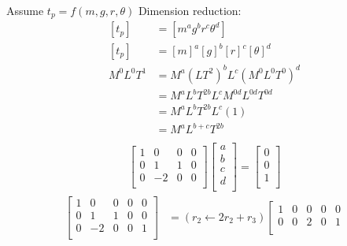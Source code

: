 \documentclass[
	date={August 26{,} 2024}
]{math486notes}
\begin{document}
\begin{example}[Pendulum]
	Assume $t_{p} = f(m, g, r, \theta)$
	Dimension reduction:
	\begin{equation*}
	\begin{aligned}
		[t_{p}] &= [m^{a}g^{b}r^{c}\theta^{d}]\\
		[t_{p}] &= [m]^{a}[g]^{b}[r]^{c}[\theta]^{d}\\
		M^{0}L^{0}T^{1} &= M^{a}\left( LT^{2} \right)^{b} L^{c} \left( M^{0}L^{0}T^{0} \right)^{d}\\
						&= M^{a}L^{b}T^{2b}L^{c} M^{0d}L^{0d}T^{0d}\\
						&= M^{a}L^{b}T^{2b}L^{c} (1)\\
						&= M^{a}L^{b+c}T^{2b}\\
	\end{aligned}
	\end{equation*}
	\begin{equation*}
	\begin{aligned}
		\left[ \begin{array}{cccc}
			 1 & 0 & 0 & 0\\
			 0 & 1 & 1 & 0\\
			0 & -2 & 0 & 0\\
		\end{array} \right]\left[ \begin{array}{c}
			a\\
			b\\
			c\\
			d\\
		\end{array} \right] = \left[ \begin{array}{c}
			0\\
			0\\
			1\\
		\end{array} \right]
	\end{aligned}
	\end{equation*}
	\begin{equation*}
	\begin{aligned}
		\left[ \begin{array}{cccc|c}
			1 &  0 & 0 & 0 & 0\\
			0 &  1 & 1 & 0 & 0\\
			0 & -2 & 0 & 0 & 1\\
		\end{array} \right]
		&= \left( r_{2} \gets 2r_{2} + r_{3} \right)\left[ \begin{array}{cccc|c}
			1 &  0 & 0 & 0 & 0\\
			0 &  0 & 2 & 0 & 1\\

\end{array}
\end{aligned}
\end{equation*}
\end{example}
\end{document}
